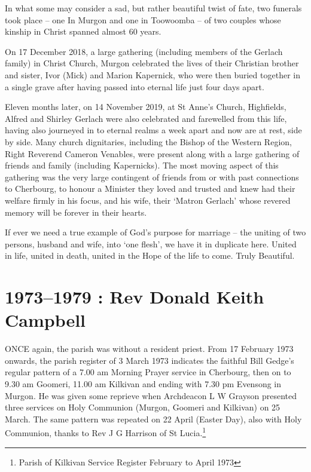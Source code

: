 In what some may consider a sad, but rather beautiful twist of fate, two funerals took place -- one In Murgon and one in Toowoomba -- of two couples whose kinship in Christ spanned almost 60 years.



On 17 December 2018, a large gathering (including members of the Gerlach family) in Christ Church, Murgon celebrated the lives of their Christian brother and sister, Ivor (Mick) and Marion Kapernick, who were then buried together in a single grave after having passed into eternal life just four days apart.



Eleven months later, on 14 November 2019, at St Anne's Church, Highfields, Alfred and Shirley Gerlach were also celebrated and farewelled from this life, having also journeyed in to eternal realms a week apart and now are at rest, side by side. Many church dignitaries, including the Bishop of the Western Region, Right Reverend Cameron Venables, were present along with a large gathering of friends and family (including Kapernicks). The most moving aspect of this gathering was the very large contingent of friends from or with past connections to Cherbourg, to honour a Minister they loved and trusted and knew had their welfare firmly in his focus, and his wife, their `Matron Gerlach' whose revered memory will be forever in their hearts.



If ever we need a true example of God's purpose for marriage -- the uniting of two persons, husband and wife, into `one flesh', we have it in duplicate here. United in life, united in death, united in the Hope of the life to come. Truly Beautiful.



\balance


\printendnotes[custom]
\setcounter{endnote}{0}
\chapter{1973--1979 : Rev Donald Keith Campbell}
\nobalance


\lettrine[lines=3]{O}{NCE}
 again, the parish was without a resident priest. From 17 February 1973 onwards, the parish register of 3 March 1973 indicates the faithful Bill Gedge's regular pattern of a 7.00 am Morning Prayer service in Cherbourg, then on to 9.30 am Goomeri, 11.00 am Kilkivan and ending with 7.30 pm Evensong in Murgon. He was given some reprieve when Archdeacon L W Grayson presented three services on Holy Communion (Murgon, Goomeri and Kilkivan) on 25 March. The same pattern was repeated on 22 April (Easter Day), also with Holy Communion, thanks to Rev J G Harrison of St Lucia.\footnote{Parish of Kilkivan Service Register February to April 1973}







